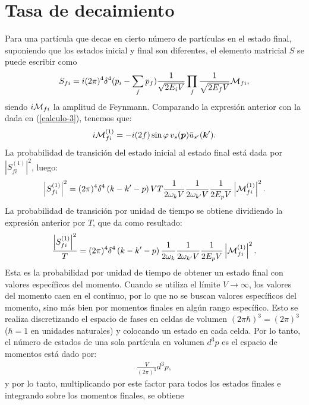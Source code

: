 \section{Tasa de decaimiento}
Para una partícula que decae en cierto número de partículas en el estado final, suponiendo que los estados inicial y final son
diferentes, el elemento matricial $S$ se puede escribir como
\begin{eqnarray}\label{elem-matricial-s-gen}
S_{fi}=i(2\pi)^4\delta^4(p_i-\sum_{f}p_f)\frac{1}{\sqrt{2E_iV}}\prod_f\frac{1}{\sqrt{2E_fV}}\mathcal{M}_{fi},
\end{eqnarray}
siendo $i\mathcal{M}_{fi}$ la amplitud de Feynmann. Comparando la expresión anterior con la dada en (\ref{calculo-3}), tenemos que:
\begin{eqnarray}\label{amplitud-feynmann-1}
i\mathcal{M}_{fi}^{(1)}=-i(2f)\sin\varphi\,v_s(\boldsymbol{p})\bar{u}_{s'}(\boldsymbol{k}').
\end{eqnarray}
La probabilidad de transición del estado inicial al estado final está dada por $\left|S_{fi}^{(1)}\right|^2$, luego:
\begin{eqnarray}\label{prob-transicion-1}
\left|S_{fi}^{(1)}\right|^2=(2\pi)^4\delta^4\left(k-k'-p\right)VT\frac{1}{2\omega_kV}\frac{1}{2\omega_{k'}V}\frac{1}{2E_pV}
\left|\mathcal{M}_{fi}^{(1)}\right|^2.
\end{eqnarray}
La probabilidad de transición por unidad de tiempo se obtiene dividiendo la expresión anterior por $T$, que da como resultado:
\begin{eqnarray}\label{prob-transicion-tiempo-1}
\frac{\left|S_{fi}^{(1)}\right|^2}{T}=(2\pi)^4\delta^4\left(k-k'-p\right)\frac{1}{2\omega_k}\frac{1}{2\omega_{k'}V}\frac{1}{
2E_pV}
\left|\mathcal{M}_{fi}^{(1)}\right|^2.
\end{eqnarray}
Esta es la probabilidad por unidad de tiempo de obtener un estado final con valores específicos del momento. Cuando se utiliza el
límite $V\rightarrow\infty$, los valores del momento caen en el continuo, por lo que no se buscan valores específicos del
momento, sino más bien por momentos finales en algún rango específico. Esto se realiza discretizando el espacio de fases en
celdas de volumen $(2\pi\hbar)^3=(2\pi)^3$ ($\hbar=1$ en unidades naturales) y colocando un estado en cada celda. Por lo tanto,
el número de estados de una sola partícula en volumen $d^3p$ es el espacio de momentos está dado por:
\begin{eqnarray*}
\frac{V}{(2\pi)^3}d^3p,
\end{eqnarray*}
y por lo tanto, multiplicando por este factor para todos los estados finales e integrando sobre los momentos finales, se obtiene
